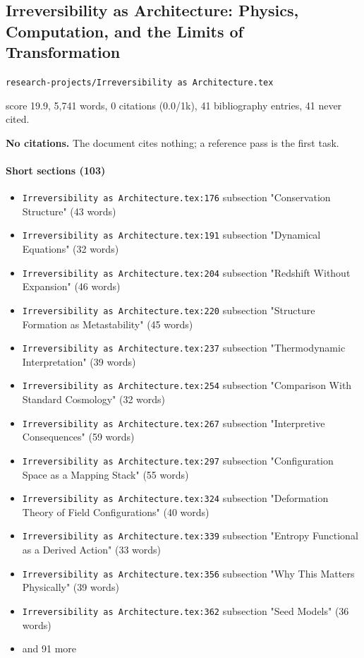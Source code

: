 \documentclass[11pt]{article}
\newcommand{\loc}[1]{{\small\color{muted}\texttt{#1}}}
\begin{document}
\subsection{Irreversibility as Architecture: Physics, Computation, and the Limits of Transformation}
\loc{research-projects/\allowbreak{}Irreversibility as Architecture.tex}\par
score 19.9, 5,741 words, 0 citations (0.0/1k), 41 bibliography entries, 41 never cited.

\textbf{No citations.} The document cites nothing; a reference pass is the first task.

\paragraph{Short sections (103)}
\begin{itemize}
\item \loc{Irreversibility as Architecture.tex:176} subsection "Conservation Structure" (43 words)
\item \loc{Irreversibility as Architecture.tex:191} subsection "Dynamical Equations" (32 words)
\item \loc{Irreversibility as Architecture.tex:204} subsection "Redshift Without Expansion" (46 words)
\item \loc{Irreversibility as Architecture.tex:220} subsection "Structure Formation as Metastability" (45 words)
\item \loc{Irreversibility as Architecture.tex:237} subsection "Thermodynamic Interpretation" (39 words)
\item \loc{Irreversibility as Architecture.tex:254} subsection "Comparison With Standard Cosmology" (32 words)
\item \loc{Irreversibility as Architecture.tex:267} subsection "Interpretive Consequences" (59 words)
\item \loc{Irreversibility as Architecture.tex:297} subsection "Configuration Space as a Mapping Stack" (55 words)
\item \loc{Irreversibility as Architecture.tex:324} subsection "Deformation Theory of Field Configurations" (40 words)
\item \loc{Irreversibility as Architecture.tex:339} subsection "Entropy Functional as a Derived Action" (33 words)
\item \loc{Irreversibility as Architecture.tex:356} subsection "Why This Matters Physically" (39 words)
\item \loc{Irreversibility as Architecture.tex:362} subsection "Seed Models" (36 words)
\item[] {\color{muted}\small and 91 more}
\end{itemize}
\end{document}
